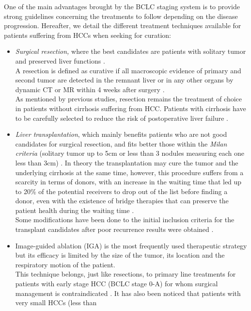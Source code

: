 \documentclass[]{article}
\begin{document}
One of the main advantages brought by the BCLC staging system is
to provide strong guidelines concerning the treatments to follow
depending on the disease progression.
Hereafter, we detail the different treatment techniques available for
patients suffering from HCCs when seeking for curation:
\begin{itemize}
\item \emph{Surgical resection,} where the best candidates are patients with
  solitary tumor and preserved liver functions \cite{Forner2018}.\\
  A resection is defined as curative if all macroscopic evidence of
  primary and second tumor are detected in the remnant liver or in any
  other organs by dynamic CT or MR within 4 weeks after surgery
  \cite{Yang2012}.\\
  As mentioned by previous studies, resection remains the treatment of
  choice in patients without cirrhosis suffering from HCC. Patients with
  cirrhosis have to be carefully selected to reduce the risk of
  postoperative liver failure \cite{Bruix2011,Llovet2012,Verslype2012}.
\item
  \emph{Liver transplantation}, which mainly benefits patients who are
  not good candidates for surgical resection, and fits better those
  within the \emph{Milan criteria} (solitary tumor up to 5cm or less
  than 3 nodules measuring each one less than 3cm) \cite{Llovet2012,Mazzaferro2011}. In theory the transplantation may cure the
  tumor and the underlying cirrhosis at the same time, however, this
  procedure suffers from a scarcity in terms of donors, with an increase
  in the waiting time that led up to 20\% of the potential receivers to
  drop out of the list before finding a donor, even with the existence
  of bridge therapies that can preserve the patient health during the
  waiting time \cite{Llovet1999}.\\
  Some modifications have been done to the initial inclusion criteria
  for the transplant candidates after poor recurrence results were
  obtained \cite{Llovet2012}.
\item Image-guided ablation (IGA) is the most frequently used
  therapeutic strategy but its efficacy is limited by the size of the
  tumor, its location and the respiratory motion of the patient.\\
  This technique belongs, just like resections, to primary line
  treatments for patients with early stage HCC (BCLC stage 0-A)
  for whom surgical management is contraindicated \cite{Bruix2011,Heimbach2018}. It has
  also been noticed that patients with very small HCCs (less than

\end{itemize}
\end{document}
